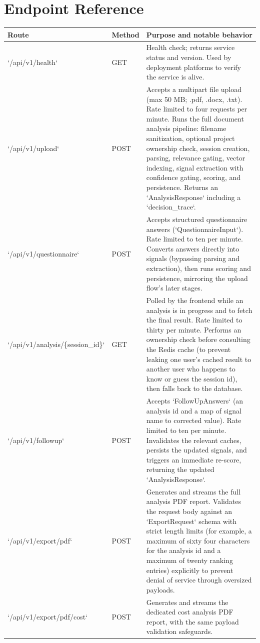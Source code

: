 \documentclass[11pt,a4paper]{report}
\begin{document}
\section{Endpoint Reference}

\begin{longtable}{p{2.6cm}p{1.1cm}p{8.6cm}}
\toprule
\textbf{Route} & \textbf{Method} & \textbf{Purpose and notable behavior} \\
\midrule
\endhead
`/api/v1/health` & GET & Health check; returns service status and version. Used by deployment platforms to verify the service is alive. \\
`/api/v1/upload` & POST & Accepts a multipart file upload (max 50 MB; .pdf, .docx, .txt). Rate limited to four requests per minute. Runs the full document analysis pipeline: filename sanitization, optional project ownership check, session creation, parsing, relevance gating, vector indexing, signal extraction with confidence gating, scoring, and persistence. Returns an `AnalysisResponse` including a `decision_trace`. \\
`/api/v1/questionnaire` & POST & Accepts structured questionnaire answers (`QuestionnaireInput`). Rate limited to ten per minute. Converts answers directly into signals (bypassing parsing and extraction), then runs scoring and persistence, mirroring the upload flow's later stages. \\
`/api/v1/analysis/\{session\_id\}` & GET & Polled by the frontend while an analysis is in progress and to fetch the final result. Rate limited to thirty per minute. Performs an ownership check before consulting the Redis cache (to prevent leaking one user's cached result to another user who happens to know or guess the session id), then falls back to the database. \\
`/api/v1/followup` & POST & Accepts `FollowUpAnswers` (an analysis id and a map of signal name to corrected value). Rate limited to ten per minute. Invalidates the relevant caches, persists the updated signals, and triggers an immediate re-score, returning the updated `AnalysisResponse`. \\
`/api/v1/export/pdf` & POST & Generates and streams the full analysis PDF report. Validates the request body against an `ExportRequest` schema with strict length limits (for example, a maximum of sixty four characters for the analysis id and a maximum of twenty ranking entries) explicitly to prevent denial of service through oversized payloads. \\
`/api/v1/export/pdf/cost` & POST & Generates and streams the dedicated cost analysis PDF report, with the same payload validation safeguards. \\

\end{longtable}
\end{document}
